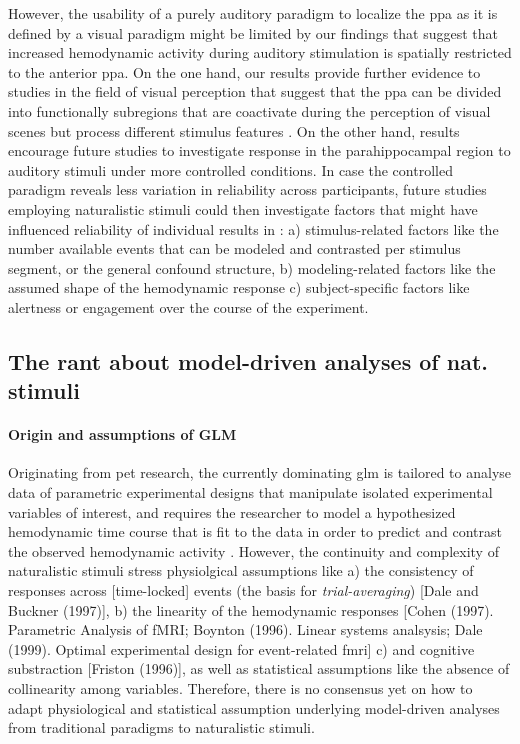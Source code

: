 %
However, the usability of a purely auditory paradigm to localize the \ac{ppa} as
it is defined by a visual paradigm might be limited by our findings that suggest
that increased hemodynamic activity during auditory stimulation is spatially
restricted to the anterior \ac{ppa}.
%
On the one hand, our results provide further evidence to studies in the field of
visual perception that suggest that the \ac{ppa} can be divided into
functionally subregions that are coactivate during the perception of visual
scenes but process different stimulus features
\citep{aminoff2007parahippocampal, baldassano2013differential}.
%
On the other hand, results encourage future studies to investigate response in
the parahippocampal region to auditory stimuli under more controlled conditions.
%
In case the controlled paradigm reveals less variation in reliability across
participants, future studies employing naturalistic stimuli could then
investigate factors that might have influenced reliability of individual results
in \citet{haeusler2022processing}:
%
a) stimulus-related factors like the number available events that can be modeled
and contrasted per stimulus segment, or the general confound structure,
%
b) modeling-related factors like the assumed shape of the hemodynamic response
%
c) subject-specific factors like alertness or engagement over the course of the
experiment.


\subsection{The rant about model-driven analyses of nat. stimuli}



\paragraph{Origin and assumptions of GLM}

%
Originating from \ac{pet} research, the currently dominating \ac{glm} is
tailored to analyse data of parametric experimental designs that
manipulate isolated experimental variables of interest, and requires the
researcher to model a hypothesized hemodynamic time course that is fit to the
data in order to predict and contrast the observed hemodynamic activity
\citep{friston1998event}.
%
However, the continuity and complexity of naturalistic stimuli stress
physiolgical assumptions like
%
a) the consistency of responses across [time-locked] events (the basis for
\textit{trial-averaging}) [Dale and Buckner (1997)],
%
b) the linearity of the hemodynamic responses [Cohen (1997). Parametric Analysis
of fMRI; Boynton (1996). Linear systems analsysis; Dale (1999). Optimal
experimental design for event-related fmri]
%
c) and cognitive substraction [Friston (1996)],
%
as well as statistical assumptions like the absence of collinearity among
variables.
%
Therefore, there is no consensus yet on how to adapt physiological and
statistical assumption underlying model-driven analyses from traditional
paradigms to naturalistic stimuli.


